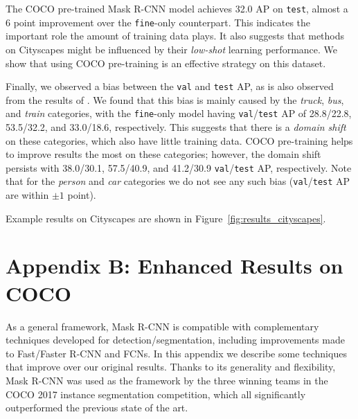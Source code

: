 \documentclass[10pt,twocolumn,letterpaper]{article}
\begin{document}
The COCO pre-trained Mask R-CNN model achieves 32.0 AP on \texttt{test}, almost a 6 point improvement over the \texttt{fine}-only counterpart. This indicates the important role the amount of training data plays. It also suggests that methods on Cityscapes might be influenced by their \emph{low-shot} learning performance. We show that using COCO pre-training is an effective strategy on this dataset.

Finally, we observed a bias between the \texttt{val} and \texttt{test} AP, as is also observed from the results of \cite{Kirillov2017,Bai2017,Liu2017}. We found that this bias is mainly caused by the \emph{truck}, \emph{bus}, and \emph{train} categories, with the \texttt{fine}-only model having \texttt{val}/\texttt{test} AP of 28.8/22.8, 53.5/32.2, and 33.0/18.6, respectively. This suggests that there is a \emph{domain shift} on these categories, which also have little training data. COCO pre-training helps to improve results the most on these categories; however, the domain shift persists with 38.0/30.1, 57.5/40.9, and 41.2/30.9 \texttt{val}/\texttt{test} AP, respectively. Note that for the \emph{person} and \emph{car} categories we do not see any such bias (\texttt{val}/\texttt{test} AP are within $\pm1$ point).

Example results on Cityscapes are shown in Figure~\ref{fig:results_cityscapes}.

\section*{Appendix B: Enhanced Results on COCO}

As a general framework, Mask R-CNN is compatible with complementary techniques developed for detection/segmentation, including improvements made to Fast/Faster R-CNN and FCNs. In this appendix we describe some techniques that improve over our original results. Thanks to its generality and flexibility, Mask R-CNN was used as the framework by the three winning teams in the COCO 2017 instance segmentation competition, which all significantly outperformed the previous state of the art.
\end{document}
